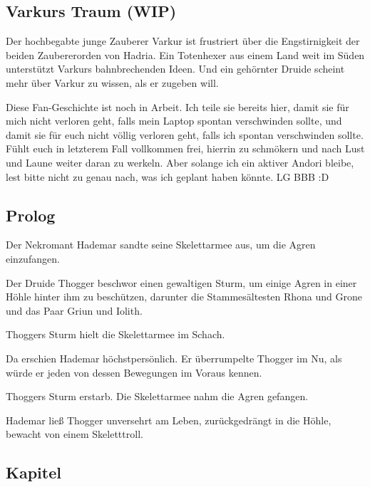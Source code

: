 \begin{chapterbox}
    \chapter{Varkurs Traum (WIP)}
    \label{wip-varkurs-traum}

    Der hochbegabte junge Zauberer Varkur ist frustriert über die Engstirnigkeit der beiden Zaubererorden von Hadria. Ein Totenhexer aus einem Land weit im Süden unterstützt Varkurs bahnbrechenden Ideen. Und ein gehörnter Druide scheint mehr über Varkur zu wissen, als er zugeben will.
\end{chapterbox}



Diese Fan-Geschichte ist noch in Arbeit. Ich teile sie bereits hier, damit sie für mich nicht verloren geht, falls mein Laptop spontan verschwinden sollte, und damit sie für euch nicht völlig verloren geht, falls ich spontan verschwinden sollte. Fühlt euch in letzterem Fall vollkommen frei, hierrin zu schmökern und nach Lust und Laune weiter daran zu werkeln. Aber solange ich ein aktiver Andori bleibe, lest bitte nicht zu genau nach, was ich geplant haben könnte. LG BBB :D



\newpage
\section{Prolog}


Der Nekromant Hademar sandte seine Skelettarmee aus, um die Agren einzufangen.

Der Druide Thogger beschwor einen gewaltigen Sturm, um einige Agren in einer Höhle hinter ihm zu beschützen, darunter die Stammesältesten Rhona und Grone und das Paar Griun und Iolith.

Thoggers Sturm hielt die Skelettarmee im Schach. 

Da erschien Hademar höchstpersönlich. Er überrumpelte Thogger im Nu, als würde er jeden von dessen Bewegungen im Voraus kennen.

Thoggers Sturm erstarb. Die Skelettarmee nahm die Agren gefangen.

Hademar ließ Thogger unversehrt am Leben, zurückgedrängt in die Höhle, bewacht von einem Skeletttroll.





\newpage
\section{Kapitel}


